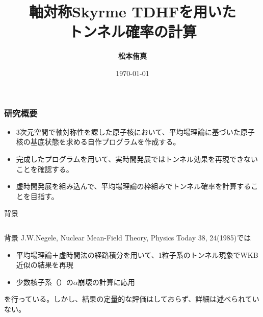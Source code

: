 \documentclass[11pt,aspectratio=169,xcolor=dvipsnames,table,dvipdfmx]{beamer}
\title{軸対称Skyrme TDHFを用いた\\トンネル確率の計算}
\author{\textbf{松本侑真}}
\date{\today}
\institute{原子核理論 関澤研究室}
\theoremstyle{definition}
\begin{document}
\maketitle

\begin{frame}
  \frametitle{研究概要}
  \begin{itemize}
    \item 3次元空間で軸対称性を課した原子核において、平均場理論に基づいた原子核の基底状態を求める自作プログラムを作成する。
    \item 完成したプログラムを用いて、実時間発展ではトンネル効果を再現できないことを確認する。
    \item 虚時間発展を組み込んで、平均場理論の枠組みでトンネル確率を計算することを目指す。
  \end{itemize}
\end{frame}


\begin{frame}{背景}
  \begin{columns}[t]
    \begin{column}{.5\textwidth}
    \end{column}
  \end{columns}

\end{frame}


\begin{frame}{背景}
  J.W.Negele, Nuclear Mean-Field Theory, Physics Today 38, 24(1985)では
  \begin{itemize}
    \item 平均場理論＋虚時間法の経路積分を用いて、1粒子系のトンネル現象でWKB近似の結果を再現
    \item 少数核子系（）の$\alpha$崩壊の計算に応用
  \end{itemize}
  を行っている。しかし、結果の定量的な評価はしておらず、詳細は述べられていない。
\end{frame}
\end{document}
